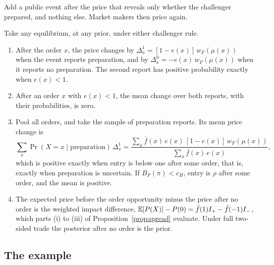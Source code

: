 Add a public event after the price that reveals only whether the challenger prepared, and nothing else. Market makers
then price again.

\begin{proposition}\label{prop:announcement}
Take any equilibrium, at any prior, under either challenger rule.
\begin{enumerate}[label=(\roman*),leftmargin=2em]
\item After the order \(x\), the price changes by \(\Delta^1_x=[1-e(x)]\,w_F(\mu(x))\) when the event reports
preparation, and by \(\Delta^0_x=-e(x)\,w_F(\mu(x))\) when it reports no preparation. The second report has positive
probability exactly when \(e(x)<1\).
\item After an order \(x\) with \(e(x)<1\), the mean change over both reports, with their probabilities, is zero.
\item Pool all orders, and take the sample of preparation reports. Its mean price change is
\[
\sum_x\Pr(X=x\mid\text{preparation})\,\Delta^1_x
=\frac{\sum_x\bar f(x)\,e(x)\,[1-e(x)]\,w_F(\mu(x))}{\sum_x\bar f(x)\,e(x)},
\]
which is positive exactly when entry is below one after some order, that is, exactly when preparation is uncertain.
If \(B_F(\pi)<c_H\), entry is \(\rho\) after some order, and the mean is positive.
\item The expected price before the order opportunity minus the price after no order is the weighted impact
difference, \(\mathbb{E}[P(X)]-P(0)=\bar f(1)I_+-\bar f(-1)I_-\), which parts (i) to (iii) of Proposition~\ref{prop:spread}
evaluate. Under full two-sided trade the posterior after no order is the prior.
\end{enumerate}
\end{proposition}

\subsection*{The example}


